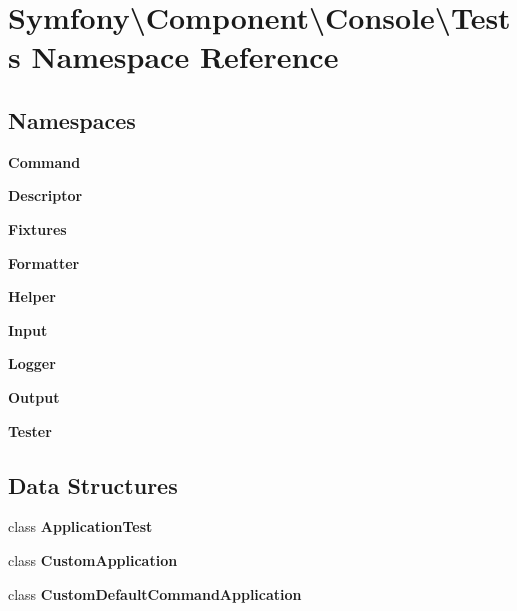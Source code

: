 \section{Symfony\textbackslash{}Component\textbackslash{}Console\textbackslash{}Tests Namespace Reference}
\label{namespace_symfony_1_1_component_1_1_console_1_1_tests}
\subsection*{Namespaces}
\begin{DoxyCompactItemize}
\item 
 {\bf Command}
\item 
 {\bf Descriptor}
\item 
 {\bf Fixtures}
\item 
 {\bf Formatter}
\item 
 {\bf Helper}
\item 
 {\bf Input}
\item 
 {\bf Logger}
\item 
 {\bf Output}
\item 
 {\bf Tester}
\end{DoxyCompactItemize}
\subsection*{Data Structures}
\begin{DoxyCompactItemize}
\item 
class {\bf Application\+Test}
\item 
class {\bf Custom\+Application}
\item 
class {\bf Custom\+Default\+Command\+Application}
\end{DoxyCompactItemize}
